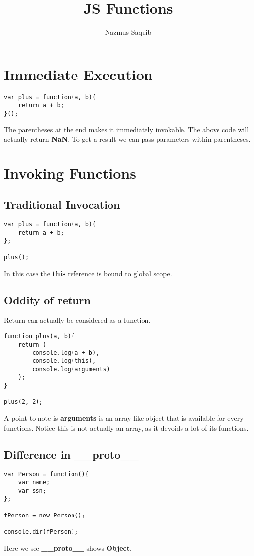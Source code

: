 \documentclass[12pt, a4paper]{article}
\begin{document}
\title{JS Functions}
\author{Nazmus Saquib}

\maketitle
\tableofcontents

\section{Immediate Execution}
\begin{verbatim}
var plus = function(a, b){
    return a + b;
}();
\end{verbatim}
The parentheses at the end makes it immediately invokable.
The above code will actually return \textbf{NaN}.
To get a result we can pass parameters within parentheses.

\section{Invoking Functions}
\subsection{Traditional Invocation}
\begin{verbatim}
var plus = function(a, b){
    return a + b;   
};

plus();
\end{verbatim}
In this case the \textbf{this} reference is bound to global scope.
\subsection{Oddity of return}
Return can actually be considered as a function.
\begin{verbatim}
function plus(a, b){
    return (
        console.log(a + b),
        console.log(this),
        console.log(arguments)
    );
}

plus(2, 2);
\end{verbatim}
A point to note is \textbf{arguments} is an array like object that is available for every functions.
Notice this is not actually an array, as it devoids a lot of its functions.
\subsection{Difference in \_\_proto\_\_}
\begin{verbatim}
var Person = function(){
    var name;
    var ssn;    
};

fPerson = new Person();

console.dir(fPerson);
\end{verbatim}
Here we see \textbf{\_\_proto\_\_} shows \textbf{Object}.
\end{document}
